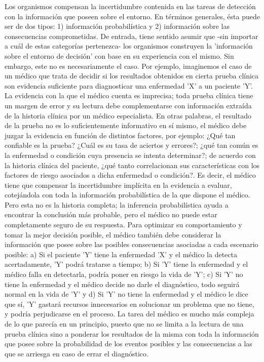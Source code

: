Los organismos compensan la incertidumbre contenida en las tareas de detección con la información que poseen sobre el entorno. En términos generales, ésta puede ser de dos tipos: 1) información probabilística y 2) información sobre las consecuencias comprometidas. De entrada, tiene sentido asumir que -sin importar a cuál de estas categorías pertenezca- los organismos construyen la 'información sobre el entorno de decisión' con base en su experiencia con el mismo. Sin embargo, este no es necesariamente el caso. Por ejemplo, imaginemos el caso de un médico que trata de decidir si los resultados obtenidos en cierta prueba clínica son evidencia suficiente para diagnosticar una enfermedad 'X' a un paciente 'Y'. La evidencia con la que el médico cuenta es imprecisa; toda prueba clínica tiene un margen de error y su lectura debe complementarse con información extraída de la historia clínica por un médico especialista. En otras palabras, el resultado de la prueba no es lo suficientemente informativo en sí mismo, el médico debe juzgar la evidencia en función de distintos factores, por ejemplo: ¿Qué tan confiable es la prueba? ¿Cuál es su tasa de aciertos y errores?; ¿qué tan común es la enfermedad o condición cuya presencia se intenta determinar?; de acuerdo con la historia clínica del paciente, ¿qué tanto correlacionan sus características con los factores de riesgo asociados a dicha enfermedad o condición?. Es decir, el médico tiene que compensar la incertidumbre implícita en la evidencia a evaluar, cotejándola con toda la información probabilística de la que dispone el médico. Pero esta no es la historia completa; la inferencia probabilística ayuda a encontrar la conclusión más probable, pero el médico no puede estar completamente seguro de su respuesta. Para optimizar su comportamiento y tomar la mejor decisión posible, el médico también debe considerar la información que posee sobre las posibles consecuencias asociadas a cada escenario posible: a) Si el paciente 'Y' tiene la enfermedad 'X' y el médico la detecta acertadamente, 'Y' podrá tratarse a tiempo; b) Si 'Y' tiene la enfermedad y el médico falla en detectarla, podría poner en riesgo la vida de 'Y'; c) Si 'Y' no tiene la enfermedad y el médico decide no darle el diagnóstico, todo seguirá normal en la vida de 'Y' y d) Si 'Y' no tiene la enfermedad y el médico le dice que sí, 'Y' gastará recursos innecesarios en solucionar un problema que no tiene, y podría perjudicarse en el proceso. La tarea del médico es mucho más compleja de lo que parecía en un principio, puesto que no se limita a la lectura de una prueba clínica sino a ponderar los resultados de la misma con toda la información que posee sobre la probabilidad de los eventos posibles y las consecuencias a las que se arriesga en caso de errar el diagnóstico.\\

